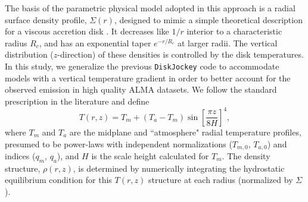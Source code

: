 \documentclass[twocolumn]{aastex61}
\begin{document}
The basis of the parametric physical model adopted in this approach is a radial surface density profile, $\Sigma(r)$, designed to mimic a simple theoretical description for a viscous accretion disk \citep{lyndenbell74,hartmann98}.  It decreases like $1/r$ interior to a characteristic radius $R_c$, and has an exponential taper $e^{-r/R_c}$ at larger radii.  The vertical distribution ($z$-direction) of these densities is controlled by the disk temperatures.  In this study, we generalize the previous {\tt DiskJockey} code to accommodate models with a vertical temperature gradient in order to better account for the observed emission in high quality ALMA datasets.  We follow the standard prescription in the literature \citep{dartois03,andrews12,rosenfeld13a} and define
\begin{equation}
	T(r, z) = T_m + (T_a - T_m)  \sin \left [ \frac{\pi z}{8 H} \right ]^4,
\end{equation}
where $T_m$ and $T_a$ are the midplane and ``atmosphere" radial temperature profiles, presumed to be power-laws with independent normalizations ($T_{m,0}$, $T_{a,0}$) and indices ($q_m$, $q_a$), and $H$ is the scale height calculated for $T_m$.  The density structure, $\rho(r, z)$, is determined by numerically integrating the hydrostatic equilibrium condition for this $T(r,z)$ structure at each radius (normalized by $\Sigma$).
\end{document}
